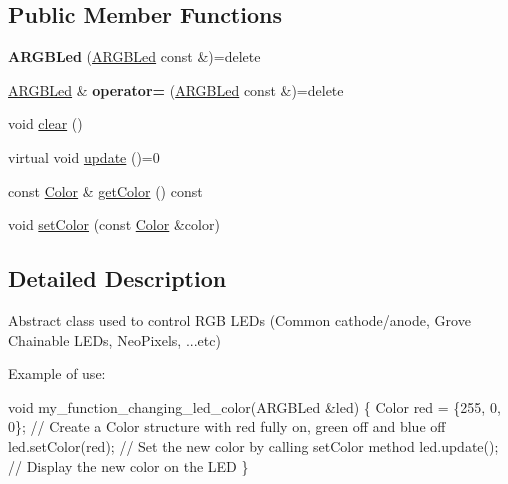 \subsection*{Public Member Functions}
\begin{DoxyCompactItemize}
\item 
\mbox{\label{classathome_1_1display_1_1_a_r_g_b_led_ac4556a22050f3a1beff3134977f72589}} 
{\bfseries A\+R\+G\+B\+Led} (\mbox{\hyperlink{classathome_1_1display_1_1_a_r_g_b_led}{A\+R\+G\+B\+Led}} const \&)=delete
\item 
\mbox{\label{classathome_1_1display_1_1_a_r_g_b_led_a8ff479add175bb3a99426301c2db87ce}} 
\mbox{\hyperlink{classathome_1_1display_1_1_a_r_g_b_led}{A\+R\+G\+B\+Led}} \& {\bfseries operator=} (\mbox{\hyperlink{classathome_1_1display_1_1_a_r_g_b_led}{A\+R\+G\+B\+Led}} const \&)=delete
\item 
void \mbox{\hyperlink{classathome_1_1display_1_1_a_r_g_b_led_a9753e3a23ea5cb6b0a41079bc6128766}{clear}} ()
\item 
virtual void \mbox{\hyperlink{classathome_1_1display_1_1_a_r_g_b_led_a725ceca0c01735daa9c95148baf075ab}{update}} ()=0
\item 
const \mbox{\hyperlink{structathome_1_1display_1_1_a_r_g_b_led_1_1_color}{Color}} \& \mbox{\hyperlink{classathome_1_1display_1_1_a_r_g_b_led_a2c3022a5aad43595fefc4b52d916467a}{get\+Color}} () const
\item 
void \mbox{\hyperlink{classathome_1_1display_1_1_a_r_g_b_led_a7ca4858c1ee10cc2f7c1dcc11a6d050e}{set\+Color}} (const \mbox{\hyperlink{structathome_1_1display_1_1_a_r_g_b_led_1_1_color}{Color}} \&color)
\end{DoxyCompactItemize}


\subsection{Detailed Description}
Abstract class used to control R\+GB L\+E\+Ds (Common cathode/anode, Grove Chainable L\+E\+Ds, Neo\+Pixels, ...etc)

Example of use\+:


\begin{DoxyCode}
\textcolor{keywordtype}{void} my\_function\_changing\_led\_color(ARGBLed &led) \{
  Color red = \{255, 0, 0\}; \textcolor{comment}{// Create a Color structure with red fully on, green off and blue off}
  led.setColor(red); \textcolor{comment}{// Set the new color by calling setColor method}
  led.update(); \textcolor{comment}{// Display the new color on the LED}
\}
\end{DoxyCode}
 

